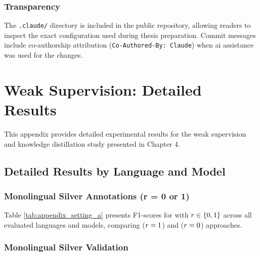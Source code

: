 \subsection{Transparency}

The \texttt{.claude/} directory is included in the public repository, allowing readers to inspect the exact configuration used during thesis preparation.
Commit messages include co-authorship attribution (\texttt{Co-Authored-By: Claude}) when \gls{ai} assistance was used for the changes.

\chapter{Weak Supervision: Detailed Results}
\label{appendix:weak_supervision}

This appendix provides detailed experimental results for the weak supervision and knowledge distillation study presented in Chapter 4.

\section{Detailed Results by Language and Model}

\subsection{Monolingual Silver Annotations (r = 0 or 1)}
\label{appendix:setting_a}

Table \ref{tab:appendix_setting_a} presents F1-scores for \Ssilver with $\rmix \in \{0, 1\}$ across all evaluated languages and models, comparing \distilmodels ($\rmix=1$) and \weakModel ($\rmix=0$) approaches.

\begin{table}[h]
    \centering
    \small
    \resizebox{1\textwidth}{!}{
    
    }
    \caption{F1-scores for \Ssilver with $\rmix \in \{0, 1\}$ by language and model. Comparison between \distilmodels ($\rmix=1$) and \weakModel ($\rmix=0$).}
    \label{tab:appendix_setting_a}
\end{table}

\clearpage

\subsection{Monolingual Silver Validation}
\label{appendix:setting_b}


